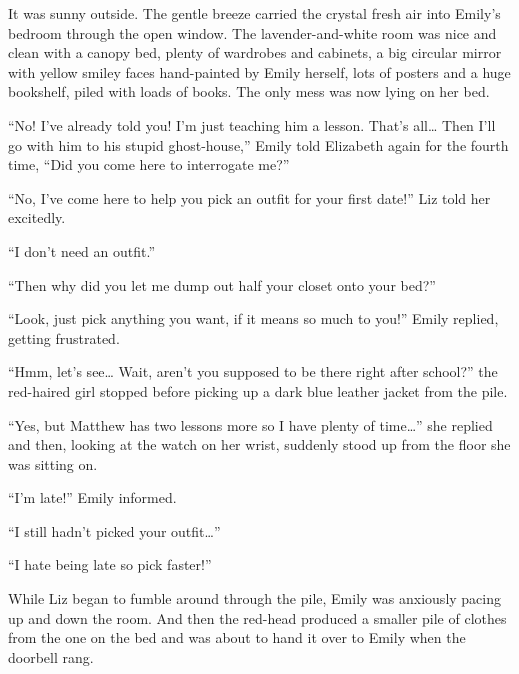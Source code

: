 It was sunny outside. The gentle breeze carried the crystal fresh air into Emily’s bedroom through the open window. The lavender-and-white room was nice and clean with a canopy bed, plenty of wardrobes and cabinets, a big circular mirror with yellow smiley faces hand-painted by Emily herself, lots of posters and a huge bookshelf, piled with loads of books. The only mess was now lying on her bed.

“No! I’ve already told you! I’m just teaching him a lesson. That’s all… Then I’ll go with him to his stupid ghost-house,” Emily told Elizabeth again for the fourth time, “Did you come here to interrogate me?”

“No, I’ve come here to help you pick an outfit for your first date!” Liz told her excitedly.

“I don’t need an outfit.”

“Then why did you let me dump out half your closet onto your bed?”

“Look, just pick anything you want, if it means so much to you!” Emily replied, getting frustrated.

“Hmm, let’s see… Wait, aren’t you supposed to be there right after school?” the red-haired girl stopped before picking up a dark blue leather jacket from the pile.

“Yes, but Matthew has two lessons more so I have plenty of time…” she replied and then, looking at the watch on her wrist, suddenly stood up from the floor she was sitting on.

“I’m late!” Emily informed.

“I still hadn’t picked your outfit…”

“I hate being late so pick faster!”

While Liz began to fumble around through the pile, Emily was anxiously pacing up and down the room.
And then the red-head produced a smaller pile of clothes from the one on the bed and was about to hand it over to Emily when the doorbell rang.